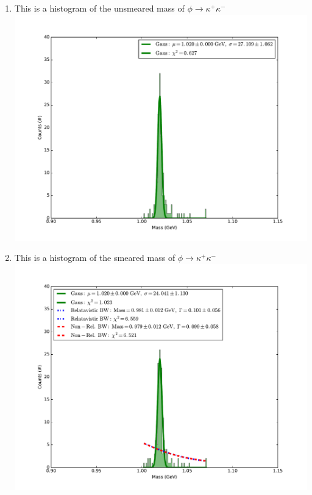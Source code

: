 \documentclass[pdftex]{article}
\begin{document}
\begin{enumerate}
	\item This is a histogram of the unsmeared mass of $\phi \rightarrow \kappa^+ \kappa^-$\\ 
	\includegraphics[scale=0.4]{non_smear.pdf}\\

	\item This is a histogram of the smeared mass of $\phi \rightarrow \kappa^+ \kappa^-$\\ 
	\includegraphics[scale=0.4]{smear.pdf}\\




\end{enumerate}
\end{document}
